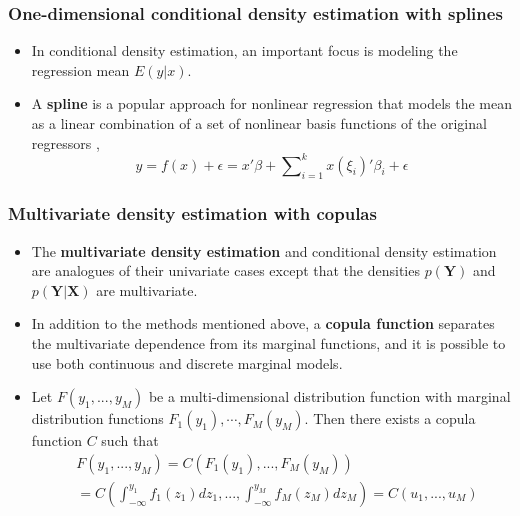 \documentclass[11pt]{beamer}
\begin{document}
\begin{frame}
  \frametitle{One-dimensional conditional density estimation with splines}

  \begin{itemize}
  \item In conditional density estimation, an important focus is modeling
    the regression mean $E(y|x)$.

  \item A \textbf{spline} is a popular approach for nonlinear regression that
    models the mean as a linear combination of a set of nonlinear basis
    functions of the original regressors \citep{holmes2003generalized},
    \[
    y=f(x)+\epsilon=x'\beta+\sum\nolimits _{i=1}^{k}x(\xi_{i})'\beta_{i}+\epsilon
    \]

  \end{itemize}
\end{frame}


\begin{frame}
  \frametitle{Multivariate density estimation with copulas}
  \begin{itemize}
  \item The \textbf{multivariate density estimation} and conditional density estimation
    are analogues of their univariate cases except that the densities
    $p(\bm{Y})$ and $p(\bm{Y}|\bm{X})$ are multivariate.

  \item In addition to the methods mentioned above, a \textbf{copula function}
    separates the multivariate dependence from its marginal functions, and it
    is possible to use both continuous and discrete marginal models.

  \item Let $F(y_{1},...,y_{M})$ be a multi-dimensional distribution function
    with marginal distribution functions
    $F_{1}(y_{1}),\cdots,F_{M}(y_{M})$. Then there exists a copula function $C$
    \citep{sklar1959fonctions} such
    that
    \[
    \begin{split}
&F(y_{1},...,y_{M})=  C(F_{1}(y_{1}),...,F_{M}(y_{M}))\\
      &=  C\left(\int_{-\infty}^{y_{1}}f_{1}(z_{1})dz_{1},...,\int_{-\infty}^{y_{M}}f_{M}(z_{M})dz_{M}\right)=C(u_{1},...,u_{M})
    \end{split}
    \]
  \end{itemize}

\end{frame}
\end{document}

